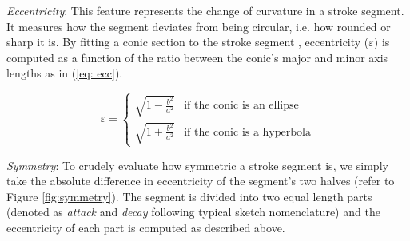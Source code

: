 
\noindent \emph{Eccentricity}: This feature represents the change of curvature in a stroke segment. It measures how the segment deviates from being circular, i.e. how rounded or sharp it is. By fitting a conic section to the stroke segment \cite{taubin1991estimation}, eccentricity ($\varepsilon$) is computed as a function of the ratio between the conic's major and minor axis lengths as in (\ref{eq: ecc}).

\begin{equation}
\varepsilon=\begin{cases}
\sqrt{1-\frac{b^{2}}{a^{2}}} & \text{if the conic is an ellipse}\\
\sqrt{1+\frac{b^{2}}{a^{2}}} & \text{if the conic is a hyperbola}
\end{cases} \label{eq: ecc}
\end{equation}





\noindent \emph{Symmetry}: To crudely evaluate how symmetric a stroke segment is, we simply take the absolute difference in eccentricity of the segment's two halves (refer to Figure \ref{fig:symmetry}). The segment is divided into two equal length parts (denoted as \emph{attack} and \emph{decay} following typical sketch nomenclature) and the eccentricity of each part is computed as described above.


